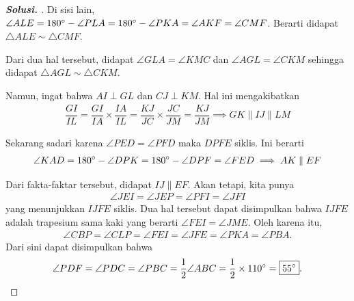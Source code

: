 \begin{proof}[\textbf{Solusi. }]
    Di sisi lain, $\angle ALE = 180^\circ - \angle PLA = 180^\circ - \angle PKA = \angle AKF = \angle CMF$. Berarti didapat $\triangle ALE \sim \triangle CMF$.

    Dari dua hal tersebut, didapat $\angle GLA = \angle KMC$ dan $\angle AGL = \angle CKM$ sehingga didapat $\triangle AGL \sim \triangle CKM$.

    Namun, ingat bahwa $AI \perp GL$ dan $CJ \perp KM$. Hal ini mengakibatkan
    \begin{align*}
        \dfrac{GI}{IL} = \dfrac{GI}{IA} \times \dfrac{IA}{IL} = \dfrac{KJ}{JC} \times \dfrac{JC}{JM} = \dfrac{KJ}{JM} \implies GK \parallel IJ \parallel LM
    \end{align*}

    Sekarang sadari karena $\angle PED = \angle PFD$ maka $DPFE$ siklis. Ini berarti
    \begin{align*}
        \angle KAD = 180^\circ - \angle DPK = 180^\circ - \angle DPF = \angle FED \implies AK \parallel EF
    \end{align*}

    Dari fakta-faktar tersebut, didapat $IJ \parallel EF$. Akan tetapi, kita punya
    \begin{align*}
        \angle JEI = \angle JEP = \angle PFI = \angle JFI 
    \end{align*}
    yang menunjukkan $IJFE$ siklis. Dua hal tersebut dapat disimpulkan bahwa $IJFE$ adalah trapesium sama kaki yang berarti $\angle FEI = \angle JME$. Oleh karena itu,
    \begin{align*}
        \angle CBP = \angle CLP = \angle  FEI = \angle JFE = \angle PKA = \angle PBA.
    \end{align*}
    Dari sini dapat disimpulkan bahwa
    \begin{align*}
        \angle PDF = \angle PDC = \angle PBC = \frac{1}{2}\angle ABC = \frac{1}{2} \times 110^\circ = \boxed{55 ^\circ}.
    \end{align*}
\end{proof}